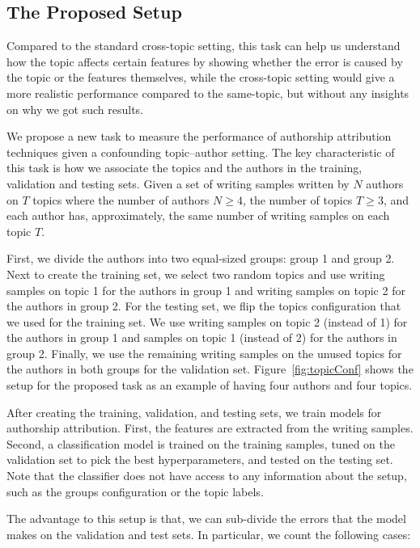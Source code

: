 \documentclass[11pt]{article}
\begin{document}
\subsection{The Proposed Setup\label{subsec:proposed}}
Compared to the standard cross-topic setting, this task can help us understand how the topic affects certain features by showing whether the error is caused by the topic or the features themselves, while the cross-topic setting would give a more realistic performance compared to the same-topic, but without any insights on why we got such results.

We propose a new task to measure the performance of authorship attribution techniques given a confounding topic--author setting. The key characteristic of this task is how we associate the topics and the authors in the training, validation and testing sets. Given a set of writing samples written by $N$ authors on $T$ topics where the number of authors $N \geq 4$, the number of topics $T \geq 3$, and each author has, approximately, the same number of writing samples on each topic $T$. 

First, we divide the authors into two equal-sized groups: group 1 and group 2. Next to create the training set, we select two random topics and use writing samples on topic 1 for the authors in group 1 and writing samples on topic 2 for the authors in group 2. For the testing set, we flip the topics configuration that we used for the training set. We use writing samples on topic 2 (instead of 1) for the authors in group 1 and samples on topic 1 (instead of 2) for the authors in group 2. Finally, we use the remaining writing samples on the unused topics for the authors in both groups for the validation set. Figure~\ref{fig:topicConf} shows the setup for the proposed task as an example of having four authors and four topics.

After creating the training, validation, and testing sets, we train models for authorship attribution. First, the features are extracted from the writing samples. Second, a classification model is trained on the training samples, tuned on the validation set to pick the best hyperparameters, and tested on the testing set. Note that the classifier does not have access to any information about the setup, such as the groups configuration or the topic labels. 

The advantage to this setup is that, we can sub-divide the errors that the model makes on the validation and test sets. In particular, we count the following cases:
\end{document}
